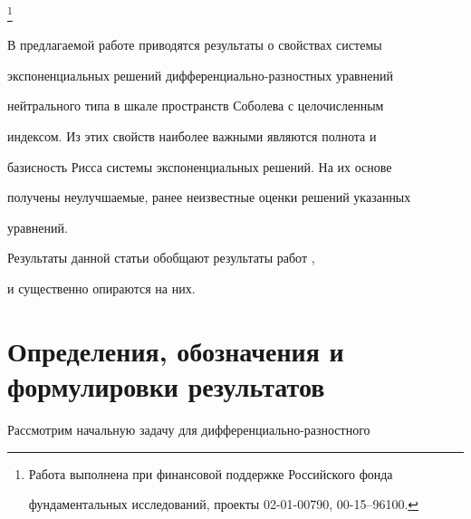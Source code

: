 \thanks{Работа выполнена при финансовой поддержке Российского фонда 


фундаментальных исследований, проекты 02-01-00790, 00-15--96100.} 


 


\date{} 




\pagestyle{plain} %


 




\maketitle 


\label{begin} 


 


 


В предлагаемой работе приводятся результаты о свойствах системы 


экспоненциальных решений дифференциально-разностных уравнений 


нейтрального типа в шкале пространств Соболева с целочисленным 


индексом. Из этих свойств наиболее важными являются полнота и 


базисность Рисса системы экспоненциальных решений. На их основе 


получены неулучшаемые, ранее неизвестные оценки решений указанных 


уравнений. 


 


Результаты данной статьи обобщают результаты работ \cite{11}, \cite{16} 


и существенно опираются на них. 


 


\section{Определения, обозначения и формулировки результатов} 


 


Рассмотрим начальную задачу для дифференциально-разностного 


